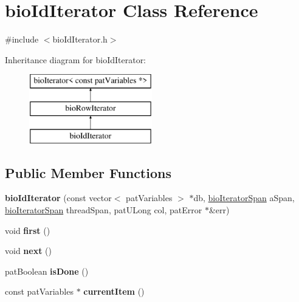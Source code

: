 \hypertarget{classbio_id_iterator}{}\section{bio\+Id\+Iterator Class Reference}
\label{classbio_id_iterator}


{\ttfamily \#include $<$bio\+Id\+Iterator.\+h$>$}

Inheritance diagram for bio\+Id\+Iterator\+:\begin{figure}[H]
\begin{center}
\leavevmode
\includegraphics[height=3.000000cm]{classbio_id_iterator}
\end{center}
\end{figure}
\subsection*{Public Member Functions}
\begin{DoxyCompactItemize}
\item 
\mbox{\label{classbio_id_iterator_a4b6afd9add23f789e9cec119c66b19cf}} 
{\bfseries bio\+Id\+Iterator} (const vector$<$ pat\+Variables $>$ $\ast$db, \hyperlink{classbio_iterator_span}{bio\+Iterator\+Span} a\+Span, \hyperlink{classbio_iterator_span}{bio\+Iterator\+Span} thread\+Span, pat\+U\+Long col, pat\+Error $\ast$\&err)
\item 
\mbox{\label{classbio_id_iterator_adccf316da0836630f483226bf1d3eb65}} 
void {\bfseries first} ()
\item 
\mbox{\label{classbio_id_iterator_a955f8547b04e487e34cba32b07c5b73c}} 
void {\bfseries next} ()
\item 
\mbox{\label{classbio_id_iterator_afb307626dc7713d66423bca121c949c9}} 
pat\+Boolean {\bfseries is\+Done} ()
\item 
\mbox{\label{classbio_id_iterator_a246b9b256643cfd980bc6cec76b78c8b}} 
const pat\+Variables $\ast$ {\bfseries current\+Item} ()
\end{DoxyCompactItemize}
